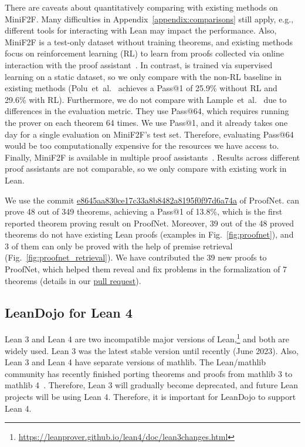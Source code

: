 There are caveats about quantitatively comparing {\name} with existing methods on MiniF2F. Many difficulties in Appendix~\ref{appendix:comparisons} still apply, e.g., different tools for interacting with Lean may impact the performance. Also, MiniF2F is a test-only dataset without training theorems, and existing methods focus on reinforcement learning (RL) to learn from proofs collected via online interaction with the proof assistant~\cite{polu2023formal,lample2022hypertree}. In contrast, {\name} is trained via supervised learning on a static dataset, so we only compare with the non-RL baseline in existing methods (Polu~et~al.~\cite{polu2023formal} achieves a Pass@1 of 25.9\% without RL and 29.6\% with RL). Furthermore, we do not compare with Lample~et~al.~\cite{lample2022hypertree} due to differences in the evaluation metric. They use Pass@64, which requires running the prover on each theorem 64 times. We use Pass@1, and it already takes one day for a single evaluation on MiniF2F's test set. Therefore, evaluating Pass@64 would be too computationally expensive for the resources we have access to. Finally, MiniF2F is available in multiple proof assistants~\cite{jiang2022thor,jiang2023draft,zhao2023decomposing}. Results across different proof assistants are not comparable, so we only compare with existing work in Lean.


We use the commit \href{https://github.com/zhangir-azerbayev/ProofNet/commit/e8645aa830ce17c33a8b8482a8195f0f97d6a74a}{e8645aa830ce17c33a8b8482a8195f0f97d6a74a} of ProofNet. {\name} can prove 48 out of 349 theorems, achieving a Pass@1 of 13.8\%, which is the first reported theorem proving result on ProofNet. Moreover, 39 out of the 48 proved theorems do not have existing Lean proofs (examples in Fig.~\ref{fig:proofnet}), and 3 of them can only be proved with the help of premise retrieval (Fig.~\ref{fig:proofnet_retrieval}).
We have contributed the 39 new proofs to ProofNet, which helped them reveal and fix problems in the formalization of 7 theorems (details in our \href{https://github.com/zhangir-azerbayev/ProofNet/pull/14}{pull request}).



\subsection{LeanDojo for Lean 4}
\label{appendix:lean4}

Lean 3 and Lean 4 are two incompatible major versions of Lean,\footnote{\url{https://leanprover.github.io/lean4/doc/lean3changes.html}} and both are widely used. Lean 3 was the latest stable version until recently (June 2023). Also, Lean 3 and Lean 4 have separate versions of mathlib. The Lean/mathlib community has recently finished porting theorems and proofs from mathlib 3 to mathlib 4~\cite{mathport}. Therefore, Lean 3 will gradually become deprecated, and future Lean projects will be using Lean 4. Therefore, it is important for LeanDojo to support Lean 4.

